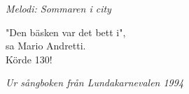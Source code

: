 {\footnotesize\textit{Melodi: Sommaren i city}}\par
\vspace{10pt}
"Den bäsken var det bett i",\\
sa Mario Andretti.\\
Körde 130!
\par
\vspace{10pt}
{\footnotesize\textit{Ur sångboken från Lundakarnevalen 1994}}
